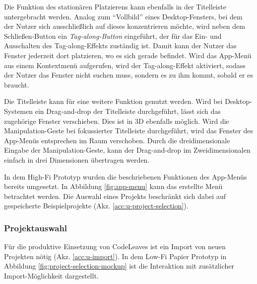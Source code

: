 Die Funktion des stationären Platzierens kann ebenfalls in der Titelleiste untergebracht werden. Analog zum "`Vollbild"' eines Desktop-Fensters, bei dem der Nutzer sich ausschließlich auf dieses konzentrieren möchte, wird neben dem Schließen-Button ein \textit{Tag-along-Button} eingeführt, der für das Ein- und Ausschalten des Tag-along-Effekts zuständig ist. Damit kann der Nutzer das Fenster jederzeit dort platzieren, wo es sich gerade befindet. Wird das App-Menü aus einem Kontextmenü aufgerufen, wird der Tag-along-Effekt aktiviert, sodass der Nutzer das Fenster nicht suchen muss, sondern es zu ihm kommt, sobald er es braucht.

Die Titelleiste kann für eine weitere Funktion genutzt werden. Wird bei Desktop-Systemen ein Drag-and-drop der Titelleiste durchgeführt, lässt sich das zugehörige Fenster verschieben. Dies ist in 3D ebenfalls möglich. Wird die Manipulation-Geste bei fokussierter Titelleiste durchgeführt, wird das Fenster des App-Menüs entsprechen im Raum verschoben. Durch die dreidimensionale Eingabe der Manipulation-Geste, kann der Drag-and-drop im Zweidimensionalen einfach in drei Dimensionen übertragen werden.

In dem High-Fi Prototyp wurden die beschriebenen Funktionen des App-Menüs bereits umgesetzt. In Abbildung \ref{fig:app-menu} kann das erstellte Menü betrachtet werden. Die Auswahl eines Projekts beschränkt sich dabei auf gespeicherte Beispielprojekte (Akz. \ref{acc:u-project-selection}).

\subsubsection*{Projektauswahl}

Für die produktive Einsetzung von CodeLeaves ist ein Import von neuen Projekten nötig (Akz. \ref{acc:u-import}). In dem Low-Fi Papier Prototyp in Abbildung \ref{fig:project-selection-mockup} ist die Interaktion mit zusätzlicher Import-Möglichkeit dargestellt.

